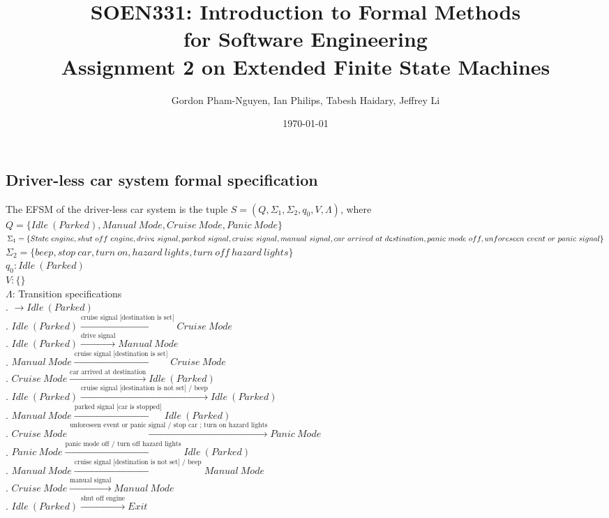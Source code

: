 \documentclass[12pt]{article}
\title{SOEN331: Introduction to Formal Methods\\for Software Engineering\\
Assignment 2 on Extended Finite State Machines}
\author{Gordon Pham-Nguyen, Ian Philips, Tabesh Haidary, Jeffrey Li}
\date{\today}
\begin{document}
\begin{spacing}{1.5}

\maketitle

\newpage

\section{Driver-less car system formal specification}

\noindent The EFSM of the driver-less car system is the tuple $S = (Q, \Sigma_1, \Sigma_2, q_0, V, \Lambda)$, where\\

\noindent $Q = \{Idle~(Parked), Manual~Mode, Cruise~Mode, Panic~Mode\}$\\
\noindent $\Sigma_1 = \{State~engine, shut~off~engine, drive~signal, parked~signal, cruise~signal, manual~signal,\\ car~arrived~at~destination, panic~mode~off, unforeseen~event~or~panic~signal\}$\\
\noindent $\Sigma_2 = \{beep, stop~car, turn~on, hazard~lights, turn~off~hazard~lights\}$\\
\noindent $q_0: Idle~(Parked)$\\
\noindent $V: \{\}$\\
\noindent $\Lambda$: Transition specifications\\
. $\rightarrow Idle~(Parked)$\\
. $Idle~(Parked) \xrightarrow {\text {cruise~signal [destination is set]}} Cruise~Mode$\\
. $Idle~(Parked) \xrightarrow {\text {drive~signal}} Manual~Mode$\\
. $Manual~Mode \xrightarrow {\text {cruise~signal [destination is set]}} Cruise~Mode$\\
. $Cruise~Mode \xrightarrow {\text {car~arrived~at~destination}} Idle~(Parked)$\\
. $Idle~(Parked) \xrightarrow {\text {cruise~signal [destination is not set] / beep}} Idle~(Parked)$\\
. $Manual~Mode \xrightarrow {\text {parked~signal [car is stopped]}} Idle~(Parked)$\\
. $Cruise~Mode \xrightarrow {\text {unforeseen~event~or~panic~signal / stop car ; turn on hazard lights}} Panic~Mode$\\
. $Panic~Mode \xrightarrow {\text {panic~mode~off / turn off hazard lights}} Idle~(Parked)$\\
. $Manual~Mode \xrightarrow {\text {cruise signal [destination is not set] / beep}} Manual~Mode$\\
. $Cruise~Mode \xrightarrow {\text {manual signal}} Manual~Mode$\\
. $Idle~(Parked) \xrightarrow {\text {shut off engine}} Exit$\\


\end{spacing}
\end{document}
